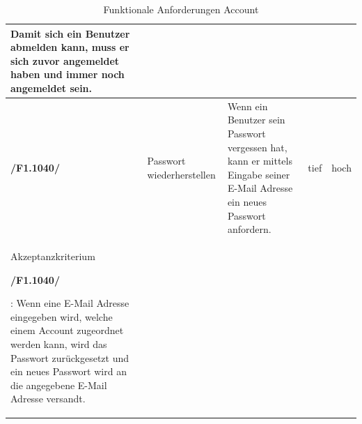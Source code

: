 \documentclass[10pt,a4paper,titlepage,twoside,german,final]{zhawreprt}
\newcommand{\AddRequirement}[2]{
\textbf{/#1#2/}
}
\newcommand{\F}[1]{
\AddRequirement{F1.}{#1}
}
\numberwithin{table}{chapter}
\begin{document}
\begin{table}[ht]
\begin{longtable}{l|p{2.5cm}|p{5cm}|p{2cm}|p{1.5cm}}
Damit sich ein Benutzer abmelden kann, muss er sich zuvor angemeldet haben und immer noch angemeldet sein.\\\hline
\F{1040} & Passwort wiederherstellen & Wenn ein Benutzer sein Passwort vergessen hat, kann er mittels Eingabe seiner E-Mail Adresse ein neues Passwort anfordern. & tief & hoch\\\hline
Akzeptanzkriterium \F{1040}:\linebreak
Wenn eine E-Mail Adresse eingegeben wird, welche einem Account zugeordnet werden kann, wird das Passwort zurückgesetzt und ein neues Passwort wird an die angegebene E-Mail Adresse versandt.\\\hline
\end{longtable}
\caption{Funktionale Anforderungen Account}\label{tbl:FuncAccount}
\end{table}
\end{document}
